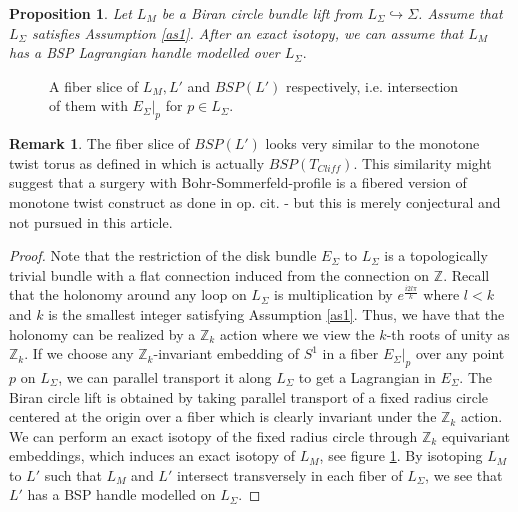 \documentclass[11pt, oneside,dvipsnames]{amsart}
\newcommand{\incfig}[2]{
   
        \def\svgscale{#1}
    {#2.pdf_tex}
      
      
  
 }
\newcommand{\Z}{\mathbb{Z}}
\newcommand{\<}{\langle}
\renewcommand{\>}{\rangle}
\newcommand{\bZ}{\mathbb{Z}}
\newtheorem{prop}[Theorem]{Proposition}
\theoremstyle{definition}
\theoremstyle{definition}
\newtheorem{remark}[Theorem]{Remark}
\numberwithin{equation}{subsection}
\begin{document}
\begin{prop}\label{prop:biranbundlehandle}
    Let $L_M$ be a Biran circle bundle lift from $L_\Sigma \hookrightarrow  \Sigma$. Assume that $L_\Sigma$ satisfies Assumption \ref{as1}. After an exact isotopy, we can assume that $L_M$ has a BSP Lagrangian handle modelled over $L_\Sigma.$ 
\end{prop}

\begin{figure}
    \makebox[\textwidth][c]{\incfig{0.8
}{drawing}}
    \caption{A fiber slice of $L_M, L'$ and $BSP(L')$ respectively, i.e. intersection of them with $E_\Sigma|_p$ for $p\in L_\Sigma$.}
    \label{fig:fiberslice}
\end{figure}
\begin{remark}
    The fiber slice of $BSP(L')$ looks very similar to the monotone twist torus as defined in \cite{Chekanov_Schlenk_notes} which is actually $BSP(T_{Cliff})$. This similarity might suggest that a surgery with Bohr-Sommerfeld-profile is a fibered version of monotone twist construct as done in op. cit. - but this is merely conjectural and not pursued in this article.
\end{remark}

\begin{proof}
    Note that the restriction of the disk bundle $E_\Sigma $ to $L_\Sigma$ is a topologically trivial bundle with a flat connection induced from the connection on $\Z$. Recall that the holonomy around any loop on $L_\Sigma$ is multiplication by  $e^{\frac{i2l\pi}{k}}$ where $l<k$ and $k$ is the smallest integer satisfying Assumption \ref{as1}. Thus, we have that the holonomy can be realized by a $\bZ_k$ action where we view the $k$-th roots of unity as $\bZ_k$. If we choose any $\bZ_k$-invariant embedding of $S^1$ in a fiber $E_\Sigma|_p$ over any point $p$ on $L_\Sigma$, we can parallel transport it along $L_\Sigma$ to get a Lagrangian in $E_\Sigma.$ The Biran circle lift is obtained by taking parallel transport of a fixed radius circle centered at the origin over a fiber which is clearly invariant under the $\bZ_k$ action. We can perform an exact isotopy of the fixed radius circle through $\bZ_k$ equivariant embeddings, which induces an exact isotopy of $L_M$, see  figure \ref{fig:fiberslice}. By isotoping $L_M$ to $L'$ such that $L_M$ and $L'$ intersect transversely in each fiber of $L_\Sigma$, we see that $L'$ has a BSP handle modelled on $L_\Sigma.$

\end{proof}
   
\end{document}
